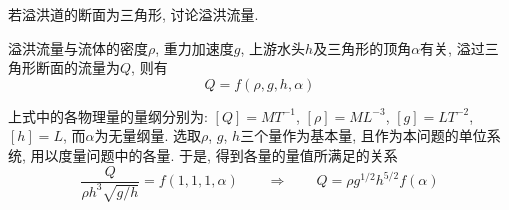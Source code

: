 \begin{problem}[10]
若溢洪道的断面为三角形, 讨论溢洪流量.
\end{problem}
\begin{solution}
\begin{minipage}[c]{0.8\linewidth}
溢洪流量与流体的密度$\rho$, 重力加速度$g$, 上游水头$h$及三角形的顶角$\alpha$有关, 溢过三角形断面的流量为$Q$, 则有
\[
Q = f(\rho, g, h, \alpha)
\]
\end{minipage}
\begin{minipage}[c]{0.2\linewidth}
\begin{center}

\end{center}
\end{minipage}
上式中的各物理量的量纲分别为: $[Q]=MT^{-1}$, $[\rho]=ML^{-3}$, $[g]=LT^{-2}$, $[h]=L$, 而$\alpha$为无量纲量. 选取$\rho$, $g$, $h$三个量作为基本量, 且作为本问题的单位系统, 用以度量问题中的各量. 于是, 得到各量的量值所满足的关系
\[
\frac{Q}{\rho h^3 \sqrt{g/h}} = f(1,1,1,\alpha) \qquad \Longrightarrow \qquad Q = \rho g^{1/2} h^{5/2}f(\alpha)
\]
\end{solution}

